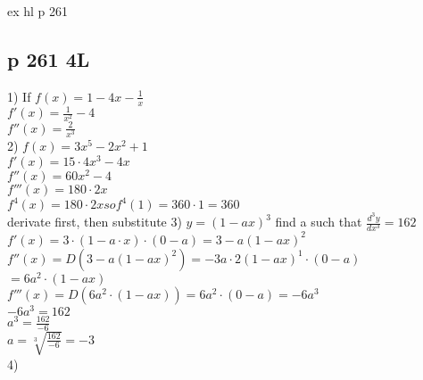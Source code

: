 \documentclass{article}
\begin{document}
  ex hl p 261\\
  \subsection{p 261 4L}
  1) If $f(x)=1-4x-\frac{1}{x}$\\
  $f'(x)=\frac{1}{x^2}-4$\\
  $f''(x)=\frac{2}{x^3}$\\
  2) $f(x)=3x^5-2x^2+1$\\
  $f'(x)=15\cdot4x^3-4x$\\
  $f''(x)=60x^2-4$\\
  $f'''(x)=180\cdot2x$\\
  $f^4(x)=180\cdot2x     so f^4(1)=360\cdot1=360$\\
  derivate first, then substitute
  3) $y=(1-ax)^3$ find a such that $\frac{d^3y}{dx^3}=162$\\
  $f'(x)=3\cdot(1-a\cdot x)\cdot (0-a)=3-a(1-ax)^2$
  $f''(x)=D(3-a(1-ax)^2)=-3a\cdot 2(1-ax)^1\cdot(0-a)$\\
  $=6a^2\cdot(1-ax)$\\
  $f'''(x)=D(6a^2\cdot(1-ax))=6a^2\cdot(0-a)=-6a^3$\\
  $-6a^3=162$\\
  $a^3=\frac{162}{-6}$\\
  $a=\sqrt[3]{\frac{162}{-6}}=-3$\\
  4)  
  
   
\end{document}
